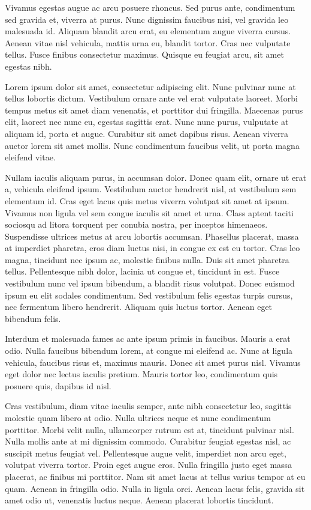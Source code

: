 \initial Vivamus egestas augue ac arcu posuere rhoncus. Sed purus ante, condimentum sed gravida et, viverra at purus. Nunc dignissim faucibus nisi, vel gravida leo malesuada id. Aliquam blandit arcu erat, eu elementum augue viverra cursus. Aenean vitae nisl vehicula, mattis urna eu, blandit tortor. Cras nec vulputate tellus. Fusce finibus consectetur maximus. Quisque eu feugiat arcu, sit amet egestas nibh.

\initial Lorem ipsum dolor sit amet, consectetur adipiscing elit. Nunc pulvinar nunc at tellus lobortis dictum. Vestibulum ornare ante vel erat vulputate laoreet. Morbi tempus metus sit amet diam venenatis, et porttitor dui fringilla. Maecenas purus elit, laoreet nec nunc eu, egestas sagittis erat. Nunc nunc purus, vulputate at aliquam id, porta et augue. Curabitur sit amet dapibus risus. Aenean viverra auctor lorem sit amet mollis. Nunc condimentum faucibus velit, ut porta magna eleifend vitae.

\initial Nullam iaculis aliquam purus, in accumsan dolor. Donec quam elit, ornare ut erat a, vehicula eleifend ipsum. Vestibulum auctor hendrerit nisl, at vestibulum sem elementum id. Cras eget lacus quis metus viverra volutpat sit amet at ipsum. Vivamus non ligula vel sem congue iaculis sit amet et urna. Class aptent taciti sociosqu ad litora torquent per conubia nostra, per inceptos himenaeos. Suspendisse ultrices metus at arcu lobortis accumsan. Phasellus placerat, massa at imperdiet pharetra, eros diam luctus nisi, in congue ex est eu tortor. Cras leo magna, tincidunt nec ipsum ac, molestie finibus nulla. Duis sit amet pharetra tellus. Pellentesque nibh dolor, lacinia ut congue et, tincidunt in est. Fusce vestibulum nunc vel ipsum bibendum, a blandit risus volutpat. Donec euismod ipsum eu elit sodales condimentum. Sed vestibulum felis egestas turpis cursus, nec fermentum libero hendrerit. Aliquam quis luctus tortor. Aenean eget bibendum felis.

\initial Interdum et malesuada fames ac ante ipsum primis in faucibus. Mauris a erat odio. Nulla faucibus bibendum lorem, at congue mi eleifend ac. Nunc at ligula vehicula, faucibus risus et, maximus mauris. Donec sit amet purus nisl. Vivamus eget dolor nec lectus iaculis pretium. Mauris tortor leo, condimentum quis posuere quis, dapibus id nisl.

\initial Cras vestibulum, diam vitae iaculis semper, ante nibh consectetur leo, sagittis molestie quam libero at odio. Nulla ultrices neque et nunc condimentum porttitor. Morbi velit nulla, ullamcorper rutrum est at, tincidunt pulvinar nisl. Nulla mollis ante at mi dignissim commodo. Curabitur feugiat egestas nisl, ac suscipit metus feugiat vel. Pellentesque augue velit, imperdiet non arcu eget, volutpat viverra tortor. Proin eget augue eros. Nulla fringilla justo eget massa placerat, ac finibus mi porttitor. Nam sit amet lacus at tellus varius tempor at eu quam. Aenean in fringilla odio. Nulla in ligula orci. Aenean lacus felis, gravida sit amet odio ut, venenatis luctus neque. Aenean placerat lobortis tincidunt.

